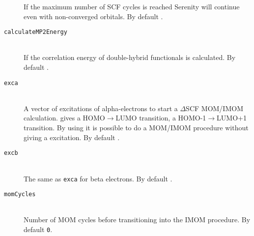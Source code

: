 \begin{description}
  If the maximum number of SCF cycles is reached Serenity will continue even with non-converged orbitals. By default .
  \item[\texttt{calculateMP2Energy}]\hfill \\
  If the correlation energy of double-hybrid functionals is calculated. By default .
  \item[\texttt{exca}]\hfill \\
  A vector of excitations of alpha-electrons to start a $\Delta$SCF MOM/IMOM~\cite{Gilbert2008,Barca2018} calculation.  gives a HOMO$\rightarrow$LUMO transition,  a HOMO-1$\rightarrow$LUMO+1 transition. By using  it is possible to do a MOM/IMOM procedure without giving a excitation. By default \ttt{\{\}}.
  \item[\texttt{excb}]\hfill \\
  The same as \texttt{exca} for beta electrons. By default \ttt{\{\}}.
  \item[\texttt{momCycles}]\hfill \\
  Number of MOM cycles before transitioning into the IMOM procedure. By default \texttt{0}.
\end{description}
